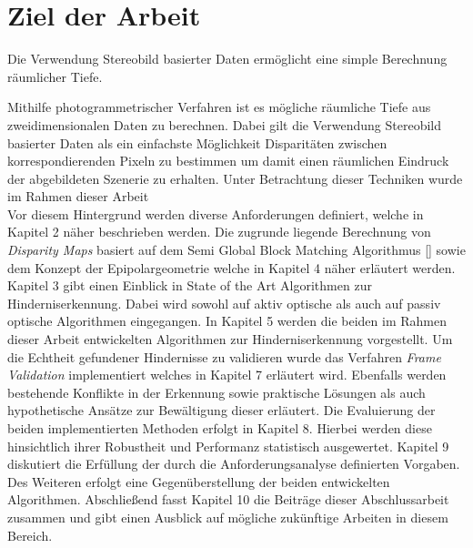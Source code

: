 \section{Ziel der Arbeit}
\label{sec:ziel_der_arbeit}
Die Verwendung Stereobild basierter Daten ermöglicht eine simple Berechnung räumlicher Tiefe.

Mithilfe photogrammetrischer Verfahren ist es mögliche räumliche Tiefe aus zweidimensionalen Daten zu berechnen. Dabei gilt die Verwendung Stereobild basierter Daten als ein einfachste Möglichkeit Disparitäten zwischen korrespondierenden Pixeln zu bestimmen um damit einen räumlichen Eindruck der abgebildeten Szenerie zu erhalten. Unter Betrachtung dieser Techniken wurde im Rahmen dieser Arbeit \\

\noindent
Vor diesem Hintergrund werden diverse Anforderungen definiert, welche in Kapitel 2 näher beschrieben werden. Die zugrunde liegende Berechnung von \emph{Disparity Maps} basiert auf dem Semi Global Block Matching Algorithmus [\cite{hirschmuller2005sgm}] sowie dem Konzept der Epipolargeometrie welche in Kapitel 4 näher erläutert werden. Kapitel 3 gibt einen Einblick in State of the Art Algorithmen zur Hinderniserkennung. Dabei wird sowohl auf aktiv optische als auch auf passiv optische Algorithmen eingegangen. In Kapitel 5 werden die beiden im Rahmen dieser Arbeit entwickelten Algorithmen zur Hinderniserkennung vorgestellt. Um die Echtheit gefundener Hindernisse zu validieren wurde das Verfahren \emph{Frame Validation} implementiert welches in Kapitel 7 erläutert wird. Ebenfalls werden bestehende Konflikte in der Erkennung sowie praktische Lösungen als auch hypothetische Ansätze zur Bewältigung dieser erläutert. Die Evaluierung der beiden implementierten Methoden erfolgt in Kapitel 8. Hierbei werden diese hinsichtlich ihrer Robustheit und Performanz statistisch ausgewertet. Kapitel 9 diskutiert die Erfüllung der durch die Anforderungsanalyse definierten Vorgaben. Des Weiteren erfolgt eine Gegenüberstellung der beiden entwickelten Algorithmen. Abschließend fasst Kapitel 10 die Beiträge dieser Abschlussarbeit zusammen und gibt einen Ausblick auf mögliche zukünftige Arbeiten in diesem Bereich.
